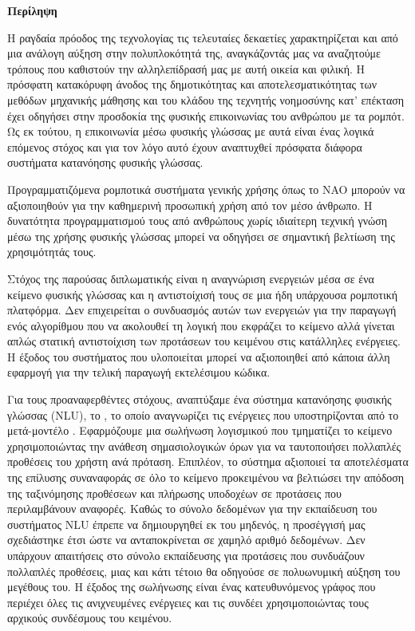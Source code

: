 \begin{center}
    \vspace{0.3cm}
    \textbf{\Large{Περίληψη}}

    \vspace{0.1cm}
\end{center}

Η ραγδαία πρόοδος της τεχνολογίας τις τελευταίες δεκαετίες χαρακτηρίζεται και από μια ανάλογη αύξηση στην πολυπλοκότητά της,
αναγκάζοντάς μας να αναζητούμε τρόπους που καθιστούν την αλληλεπίδρασή μας με αυτή οικεία και φιλική.
Η πρόσφατη κατακόρυφη άνοδος της δημοτικότητας και αποτελεσματικότητας των μεθόδων μηχανικής μάθησης
και του κλάδου της τεχνητής νοημοσύνης κατ' επέκταση
έχει οδηγήσει στην προσδοκία της φυσικής επικοινωνίας του ανθρώπου με τα ρομπότ.
Ως εκ τούτου, η επικοινωνία μέσω φυσικής γλώσσας με αυτά είναι ένας λογικά επόμενος στόχος και για τον λόγο αυτό έχουν αναπτυχθεί πρόσφατα διάφορα συστήματα κατανόησης φυσικής γλώσσας.

Προγραμματιζόμενα ρομποτικά συστήματα γενικής χρήσης όπως το NAO μπορούν να αξιοποιηθούν για την καθημερινή προσωπική χρήση από τον μέσο άνθρωπο.
Η δυνατότητα προγραμματισμού τους από ανθρώπους χωρίς ιδιαίτερη τεχνική γνώση μέσω της χρήσης φυσικής γλώσσας μπορεί να οδηγήσει σε σημαντική βελτίωση της χρησιμότητάς τους.

Στόχος της παρούσας διπλωματικής είναι η αναγνώριση ενεργειών μέσα σε ένα κείμενο φυσικής γλώσσας και η αντιστοίχισή τους σε μια ήδη υπάρχουσα ρομποτική πλατφόρμα.
Δεν επιχειρείται ο συνδυασμός αυτών των ενεργειών για την παραγωγή ενός αλγορίθμου που να ακολουθεί τη λογική που εκφράζει το κείμενο
αλλά γίνεται απλώς στατική αντιστοίχιση των προτάσεων του κειμένου στις κατάλληλες ενέργειες.
Η έξοδος του συστήματος που υλοποιείται μπορεί να αξιοποιηθεί από κάποια άλλη εφαρμογή για την τελική παραγωγή εκτελέσιμου κώδικα.

Για τους προαναφερθέντες στόχους, αναπτύξαμε ένα σύστημα κατανόησης φυσικής γλώσσας (NLU), το \projectname{}, το οποίο αναγνωρίζει τις ενέργειες που υποστηρίζονται από το μετά-μοντέλο \metamodel{}.
Εφαρμόζουμε μια σωλήνωση λογισμικού που τμηματίζει το κείμενο χρησιμοποιώντας την ανάθεση σημασιολογικών όρων για να ταυτοποιήσει πολλαπλές προθέσεις του χρήστη ανά πρόταση.
Επιπλέον, το σύστημα αξιοποιεί τα αποτελέσματα της επίλυσης συναναφοράς σε όλο το κείμενο προκειμένου να βελτιώσει την απόδοση της ταξινόμησης προθέσεων και πλήρωσης υποδοχέων σε προτάσεις που περιλαμβάνουν αναφορές.
Καθώς το σύνολο δεδομένων για την εκπαίδευση του συστήματος NLU έπρεπε να δημιουργηθεί εκ του μηδενός, η προσέγγισή μας σχεδιάστηκε έτσι ώστε να ανταποκρίνεται σε χαμηλό αριθμό δεδομένων.
Δεν υπάρχουν απαιτήσεις στο σύνολο εκπαίδευσης για προτάσεις που συνδυάζουν πολλαπλές προθέσεις, μιας και κάτι τέτοιο θα οδηγούσε σε πολυωνυμική αύξηση του μεγέθους του.
Η έξοδος της σωλήνωσης είναι ένας κατευθυνόμενος γράφος που περιέχει όλες τις ανιχνευμένες ενέργειες και τις συνδέει χρησιμοποιώντας τους αρχικούς συνδέσμους του κειμένου.

